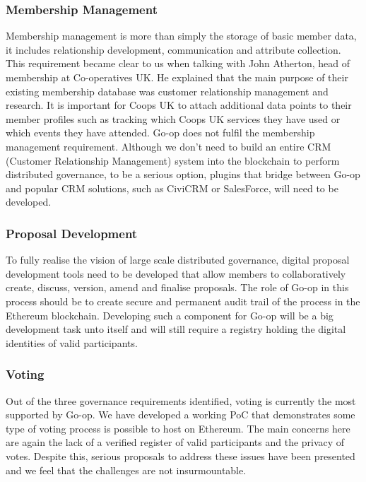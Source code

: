 \subsubsection{Membership Management}
Membership management is more than simply the storage of basic member data, it includes relationship development, communication and attribute collection. This requirement became clear to us when talking with John Atherton, head of membership at Co-operatives UK. He explained that the main purpose of their existing membership database was customer relationship management and research. It is important for Coops UK to attach additional data points to their member profiles such as tracking which Coops UK services they have used or which events they have attended. Go-op does not fulfil the membership management requirement. Although we don't need to build an entire CRM (Customer Relationship Management) system into the blockchain to perform distributed governance, to be a serious option, plugins that bridge between Go-op and popular CRM solutions, such as CiviCRM\cite{CiviCRM} or SalesForce\cite{SalesForce}, will need to be developed.\\

\subsubsection{Proposal Development}
To fully realise the vision of large scale distributed governance, digital proposal development tools need to be developed that allow members to collaboratively create, discuss, version, amend and finalise proposals. The role of Go-op in this process should be to create secure and permanent audit trail of the process in the Ethereum blockchain. Developing such a component for Go-op will be a big development task unto itself and will still require a registry holding the digital identities of valid participants.\\

\subsubsection{Voting}
Out of the three governance requirements identified, voting is currently the most supported by Go-op. We have developed a working PoC that demonstrates some type of voting process is possible to host on Ethereum. The main concerns here are again the lack of a verified register of valid participants and the privacy of votes. Despite this, serious proposals to address these issues have been presented and we feel that the challenges are not insurmountable.\\


